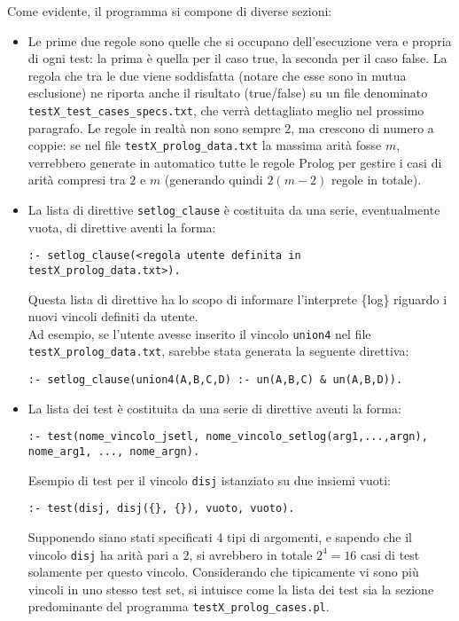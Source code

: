 Come evidente, il programma si compone di diverse sezioni:\\
\begin{itemize}
\item Le prime due regole sono quelle che si occupano dell'esecuzione vera e propria di ogni test: la prima è quella per il caso true, la seconda per il caso false. La regola che tra le due viene soddisfatta (notare che esse sono in mutua esclusione) ne riporta anche il risultato (true/false) su un file denominato \\ \texttt{testX\_test\_cases\_specs.txt}, che verrà dettagliato meglio nel prossimo paragrafo. Le regole in realtà non sono sempre $2$, ma crescono di numero a coppie: se nel file \texttt{testX\_prolog\_data.txt} la massima arità fosse $m$, verrebbero generate in automatico tutte le regole Prolog per gestire i casi di arità compresi tra $2$ e $m$ (generando quindi $2(m - 2)$ regole in totale).\\

\item La lista di direttive \texttt{setlog\_clause} è costituita da una serie, eventualmente vuota, di direttive aventi la forma:
\begin{verbatim}
:- setlog_clause(<regola utente definita in testX_prolog_data.txt>).
\end{verbatim}

Questa lista di direttive ha lo scopo di informare l'interprete \{log\} riguardo i nuovi vincoli definiti da utente.\\
Ad esempio, se l'utente avesse inserito il vincolo \texttt{union4} nel file \texttt{testX\_prolog\_data.txt}, sarebbe stata generata la seguente direttiva:
\begin{verbatim}
:- setlog_clause(union4(A,B,C,D) :- un(A,B,C) & un(A,B,D)).

\end{verbatim}

\item La lista dei test è costituita da una serie di direttive aventi la forma:
\begin{verbatim}
:- test(nome_vincolo_jsetl, nome_vincolo_setlog(arg1,...,argn),
nome_arg1, ..., nome_argn).
\end{verbatim}

Esempio di test per il vincolo \texttt{disj} istanziato su due insiemi vuoti:
\begin{verbatim}
:- test(disj, disj({}, {}), vuoto, vuoto).
\end{verbatim}

Supponendo siano stati specificati 4 tipi di argomenti, e sapendo che il vincolo \texttt{disj} ha arità pari a $2$, si avrebbero in totale $2^4 = 16$ casi di test solamente per questo vincolo.
Considerando che tipicamente vi sono più vincoli in uno stesso test set, si intuisce come la lista dei test sia la sezione predominante del programma \texttt{testX\_prolog\_cases.pl}.
\end{itemize}

